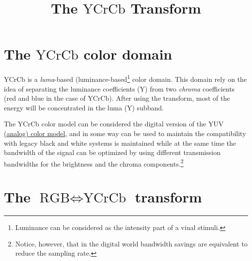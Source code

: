 
\title{The $\text{YCrCb}$ Transform}
\maketitle

\tableofcontents

\section{The $\text{YCrCb}$ color domain}
$\text{YCrCb}$ is a \emph{luma}-based
(luminance-based\footnote{Luminance can be considered as the intensity
part of a viual stimuli.} color domain. This domain rely on the idea
of separating the luminance coefficients (Y) from two \emph{chroma}
coefficients (red and blue in the case of $\text{YCrCb}$). After using
the transform, most of the energy will be concentrated in the luma
($\text{Y}$) subband.

The $\text{YCrCb}$ color model can be considered the digital version
of the \href{https://en.wikipedia.org/wiki/YUV}{$\text{YUV}$ (analog)
  color model}, and in some way can be used to maintain the
compatibility with legacy black and white systems is maintained while
at the same time the bandwidth of the signal can be optimized by using
diﬀerent transmission bandwidths for the brightness and the chroma
components.\footnote{Notice, however, that in the digital world
bandwidth savings are equivalent to reduce the sampling
rate.}~\cite{burger2016digital}

\section{The $\text{RGB} \Leftrightarrow \text{YCrCb}$ transform}

